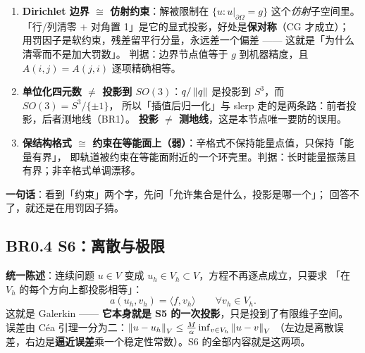 \begin{enumerate}[leftmargin=1.5em]
  \item \textbf{Dirichlet 边界 $\cong$ 仿射约束}：解被限制在 $\{u:u|_{\partial\Omega}=g\}$ 这个\emph{仿射}子空间里。
        「行/列清零 $+$ 对角置 1」是它的显式投影，好处是\textbf{保对称}（CG 才成立）；
        用罚因子是软约束，残差留平行分量，永远差一个偏差 —— 这就是「为什么清零而不是加大罚数」。
        判据：边界节点值等于 $g$ 到机器精度，且 $A(i,j)=A(j,i)$ 逐项精确相等。
  \item \textbf{单位化四元数 $\ne$ 投影到 $SO(3)$}：$q/\left\lVert q\right\rVert$ 是投影到 $S^{3}$，而 $SO(3)=S^{3}/\{\pm1\}$，
        所以「插值后归一化」与 slerp 走的是两条路：前者投影，后者测地线（BR1）。
        \textbf{投影 $\ne$ 测地线}，这是本节点唯一要防的误用。
  \item \textbf{保结构格式 $\cong$ 约束在等能面上（弱）}：辛格式不保持能量点值，只保持「能量有界」，
        即轨道被约束在等能面附近的一个环壳里。判据：长时能量振荡且有界；非辛格式单调漂移。
\end{enumerate}

\textbf{一句话}：看到「约束」两个字，先问「允许集合是什么，投影是哪一个」；
回答不了，就还是在用罚因子猜。

\subsection{BR0.4 S6：离散与极限}

\textbf{统一陈述}：连续问题 $u\in V$ 变成 $u_h\in V_h\subset V$，方程不再逐点成立，只要求
「在 $V_h$ 的每个方向上都投影相等」：
\[
a(u_h,v_h)=\langle f,v_h\rangle\qquad\forall v_h\in V_h .
\]
这就是 Galerkin —— \textbf{它本身就是 S5 的一次投影}，只是投到了有限维子空间。
误差由 Céa 引理一分为二：$\left\lVert u-u_h\right\rVert_V\le\frac{M}{\alpha}\inf_{v\in V_h}\left\lVert u-v\right\rVert_V$
（左边是离散误差，右边是\textbf{逼近误差}乘一个稳定性常数）。S6 的全部内容就是这两项。

